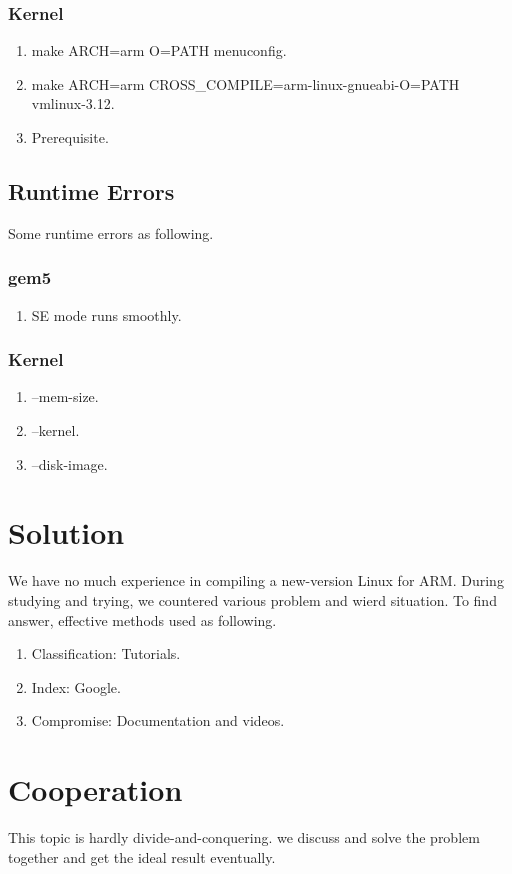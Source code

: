 \documentclass[utf8,a4paper]{ctexart}
\begin{document}
		\subsubsection{Kernel}
			\begin{enumerate}
				\item
				make ARCH=arm O=PATH menuconfig.
				\item
				make ARCH=arm CROSS\_COMPILE=arm-linux-gnueabi-O=PATH vmlinux-3.12.
				\item
				Prerequisite.
			\end{enumerate}
			
	\subsection{Runtime Errors}
	Some runtime errors as following.
		\subsubsection{gem5}
			\begin{enumerate}
				\item
				SE mode runs smoothly.
			\end{enumerate}
		\subsubsection{Kernel}
			\begin{enumerate}
				\item
				–mem-size.
				\item
				–kernel.
				\item
				–disk-image.		
			\end{enumerate}

\section{Solution}
We have no much experience in compiling a new-version Linux for ARM. During studying and trying, we countered various problem and wierd situation. To find answer, effective methods used as following.
	\begin{enumerate}
		\item
		Classification: Tutorials.
		\item
		Index: Google.
		\item
		Compromise: Documentation and videos.
	\end{enumerate}
	
\section{Cooperation}
This topic is hardly divide-and-conquering. we discuss and solve the problem together and get the ideal result eventually.
\end{document}
